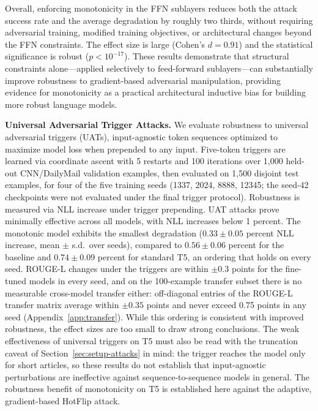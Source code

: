\documentclass{article}
\theoremstyle{plain}
\theoremstyle{definition}
\theoremstyle{remark}
\begin{document}
Overall, enforcing monotonicity in the FFN sublayers reduces both the attack success rate and the average degradation by roughly two thirds, without requiring adversarial training, modified training objectives, or architectural changes beyond the FFN constraints. The effect size is large (Cohen's $d = 0.91$) and the statistical significance is robust ($p < 10^{-17}$). These results demonstrate that structural constraints alone---applied selectively to feed-forward sublayers---can substantially improve robustness to gradient-based adversarial manipulation, providing evidence for monotonicity as a practical architectural inductive bias for building more robust language models.

\textbf{Universal Adversarial Trigger Attacks.}
We evaluate robustness to universal adversarial triggers (UATs), input-agnostic token sequences optimized to maximize model loss when prepended to any input. Five-token triggers are learned via coordinate ascent with 5 restarts and 100 iterations over 1{,}000 held-out CNN/DailyMail validation examples, then evaluated on 1{,}500 disjoint test examples, for four of the five training seeds (1337, 2024, 8888, 12345; the seed-42 checkpoints were not evaluated under the final trigger protocol). Robustness is measured via NLL increase under trigger prepending. UAT attacks prove minimally effective across all models, with NLL increases below 1 percent. The monotonic model exhibits the smallest degradation ($0.33 \pm 0.05$ percent NLL increase, mean $\pm$ s.d.\ over seeds), compared to $0.56 \pm 0.06$ percent for the baseline and $0.74 \pm 0.09$ percent for standard T5, an ordering that holds on every seed. ROUGE-L changes under the triggers are within $\pm 0.3$ points for the fine-tuned models in every seed, and on the 100-example transfer subset there is no measurable cross-model transfer either: off-diagonal entries of the ROUGE-L transfer matrix average within $\pm 0.35$ points and never exceed 0.75 points in any seed (Appendix~\ref{app:transfer}). While this ordering is consistent with improved robustness, the effect sizes are too small to draw strong conclusions. %
The weak effectiveness of universal triggers on T5 must also be read with the truncation caveat of Section~\ref{sec:setup-attacks} in mind: the trigger reaches the model only for short articles, so these results do not establish that input-agnostic perturbations are ineffective against sequence-to-sequence models in general. The robustness benefit of monotonicity on T5 is established here against the adaptive, gradient-based HotFlip attack.
\end{document}
